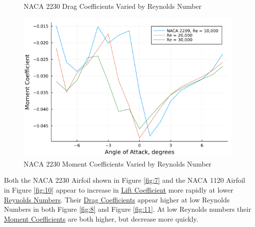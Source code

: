 \documentclass{article}
\begin{document}
\begin{figure}[!htb]
  \caption{NACA 2230 Drag Coefficients Varied by Reynolds Number}\label{fig:8}
\endminipage\hfill
{}
  \includegraphics[width=\linewidth]{Figure9.png}
  \caption{NACA 2230 Moment Coefficients Varied by Reynolds Number}\label{fig:9}
\endminipage
\end{figure}

Both the NACA 2230 Airfoil shown in Figure \ref{fig:7} and the NACA 1120 Airfoil in Figure \ref{fig:10} appear to increase in \hyperlink{CL}{Lift Coefficient} more rapidly at lower \hyperlink{Re}{Reynolds Numbers}. Their \hyperlink{CD}{Drag Coefficients} appear higher at low Reynolds Numbers in both Figure \ref{fig:8} and Figure \ref{fig:11}. At low Reynolds numbers their \hyperlink{CM}{Moment Coefficients} are both higher, but decrease more quickly.
\end{document}
